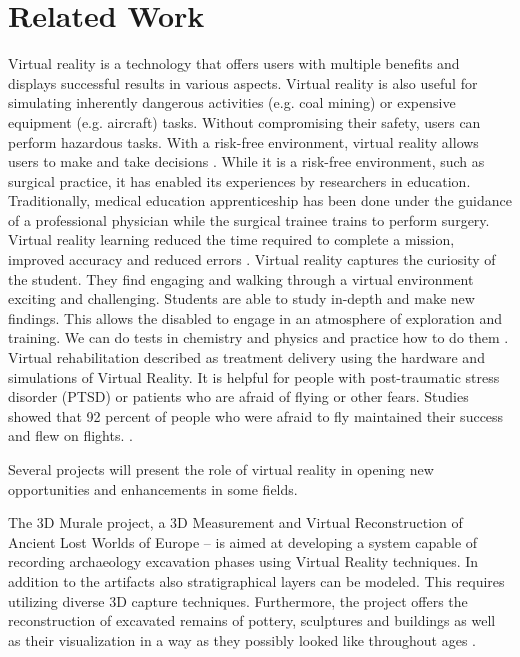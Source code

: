   
\section{Related Work}

Virtual reality is a technology that offers users with multiple benefits and displays successful results in various aspects. Virtual reality is also useful for simulating inherently dangerous activities (e.g. coal mining) or expensive equipment (e.g. aircraft) tasks. Without compromising their safety, users can perform hazardous tasks. With a risk-free environment, virtual reality allows users to make and take decisions \citep{Aguinas2004}. While it is a risk-free environment, such as surgical practice, it has enabled its experiences by researchers in education. Traditionally, medical education apprenticeship has been done under the guidance of a professional physician while the surgical trainee trains to perform surgery. Virtual reality learning reduced the time required to complete a mission, improved accuracy and reduced errors \citep{Ks2009}. Virtual reality captures the curiosity of the student. They find engaging and walking through a virtual environment exciting and challenging. Students are able to study in-depth and make new findings. This allows the disabled to engage in an atmosphere of exploration and training. We can do tests in chemistry and physics and practice how to do them \citep{Pantelidis2010}. Virtual rehabilitation described as treatment delivery using the hardware and simulations of Virtual Reality. It is helpful for people with post-traumatic stress disorder (PTSD) or patients who are afraid of flying or other fears. Studies showed that 92 percent of people who were afraid to fly maintained their success and flew on flights. \citep{Burdea2003}.


Several projects will present the role of virtual reality in opening new opportunities and enhancements in some fields.

The 3D Murale project, a 3D Measurement and Virtual Reconstruction of Ancient Lost Worlds of Europe – is aimed at developing a system capable of recording archaeology excavation phases using Virtual Reality techniques. In addition to the artifacts also stratigraphical layers can be modeled. This requires utilizing diverse 3D capture techniques. Furthermore, the project offers the reconstruction of excavated remains of pottery, sculptures and buildings as well as their visualization in a way as they possibly looked like throughout ages \citep{Rahaman2011InterpretingPerspective}.










